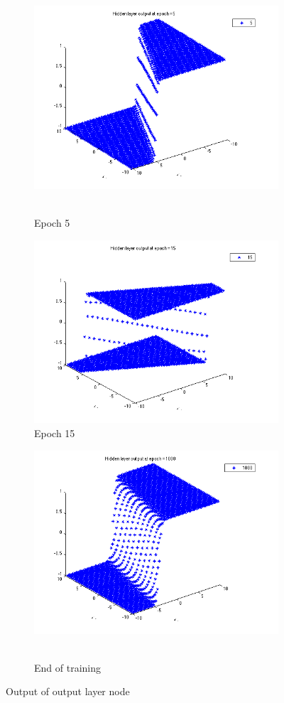\documentclass{article}
\begin{document}
\begin{figure}
  \begin{subfigure}{.5\textwidth}
  \centering
  \includegraphics[width=.8\linewidth]{Regression/bivariate/hidden_2layer_5.png}\
  \caption{Epoch 5}
\end{subfigure}%
\begin{subfigure}{.5\textwidth}
  \centering
  \includegraphics[width=.8\linewidth]{Regression/bivariate/hidden_2layer_15.png}
   \caption{Epoch 15}
  \end{subfigure}
  
  \begin{subfigure}{.5\textwidth}
  \centering
  \includegraphics[width=.8\linewidth]{Regression/bivariate/hidden_2layer_1000.png}\
  \caption{End of training}
\end{subfigure}%
  
\caption{Output of output layer node}
\end{figure}
\end{document}
